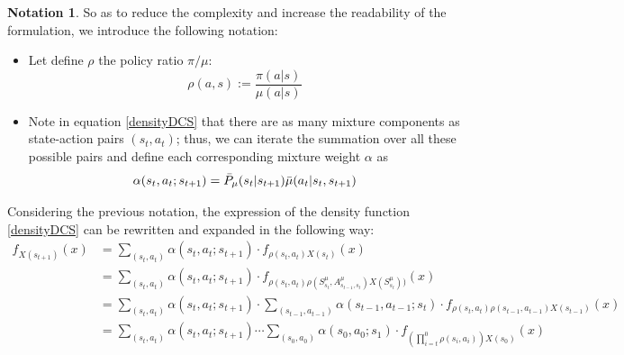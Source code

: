 \documentclass[12pt,a4paper,openright,twoside]{article}
\numberwithin{equation}{section}
\theoremstyle{definition}
\newtheorem*{notation}{Notation}
\theoremstyle{remark}
\theoremstyle{plain}
\begin{document}
\begin{notation}
	So as to reduce the complexity and increase the readability of the formulation, we introduce the following notation:
	
	\begin{itemize}
		\item Let define $\rho$ the policy ratio $\pi / \mu$:
		\begin{equation*}
			\rho(a,s) := \frac{\pi(a|s)}{\mu(a|s)}
		\end{equation*}

	\item Note in equation \ref{densityDCS} that there are as many mixture components as state-action pairs $(s_t,a_t)$; thus, we can iterate the summation over all these possible pairs and define each corresponding mixture weight $\alpha$ as
		\begin{equation*}
			\alpha(s_{t},a_{t}; s_{t+1}) = \Bar{P}_\mu (s_{t} | s_{t+1}) \Bar{\mu}(a_t|s_{t},s_{t+1}) 
		\end{equation*}
	\end{itemize}
\end{notation}

Considering the previous notation, the expression of the density function \ref{densityDCS} can be rewritten and expanded in the following way:
\begin{equation}
\begin{split}
    f_{X(s_{t+1})}(x) &= \sum_{(s_{t},a_{t})} \alpha(s_{t},a_{t};s_{t+1}) \cdot f_{\rho(s_{t},a_{t}) X(s_{t})}(x) \\
    &= \sum_{(s_{t},a_{t})} \alpha(s_{t},a_{t};s_{t+1}) \cdot f_{\rho(s_{t},a_{t}) \rho(S^{\mu}_{s_{t}},A^{\mu}_{s_{t-1},s_{t}}) X(S^{\mu}_{s_t}) )}(x) \\
    &= \sum_{(s_{t},a_{t})} \alpha(s_{t},a_{t};s_{t+1}) \cdot \sum_{(s_{t-1},a_{t-1})} \alpha(s_{t-1},a_{t-1};s_{t})   \cdot f_{\rho(s_{t},a_{t}) \rho(s_{t-1},a_{t-1}) X(s_{t-1})}(x) \\
    &= \sum_{(s_{t},a_{t})} \alpha(s_{t},a_{t};s_{t+1}) \cdots \sum_{(s_{0},a_{0})} \alpha(s_{0},a_{0};s_{1}) \cdot f_{ \left(\prod_{i=t}^{0} \rho(s_{i},a_{i})\right)  X(s_{0})}(x)
\end{split}
\end{equation}
\end{document}
